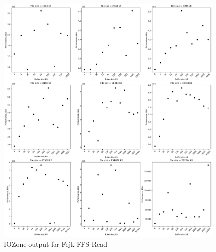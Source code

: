 \begin{figure}[!htb]
	\label{fig:bench_fffs_read}
	\begin{center}
		\includegraphics[width=1.0\textwidth]{figures/benchmarking/fejk-ffs/Read.pdf}
	\end{center}
	\caption{IOZone output for Fejk FFS Read}
\end{figure}

